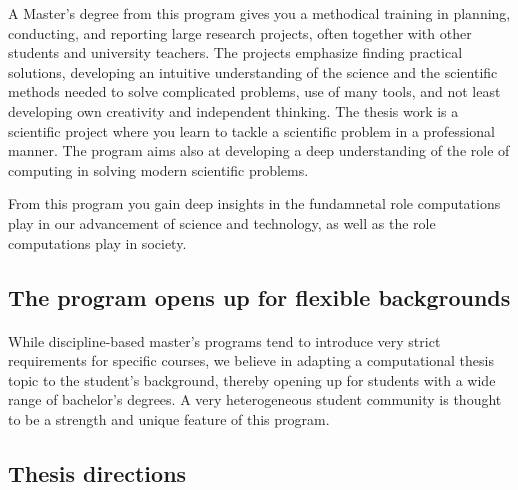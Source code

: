 \documentclass[%
oneside,                 %
final,                   %
10pt]{article}
\begin{document}
A Master’s degree from this program gives you a methodical
training in planning, conducting, and reporting large research
projects, often together with other students and university teachers.
The projects emphasize finding practical solutions, developing an
intuitive understanding of the science and the scientific methods
needed to solve complicated problems, use of many tools, and not least
developing own creativity and independent thinking. The thesis
work is a scientific project where you learn to tackle a
scientific problem in a professional manner.   The program aims also at
developing a deep understanding of the role of computing in solving modern scientific
problems. 

From this program you gain  deep insights in the fundamnetal role
computations play  in our advancement of science and technology, as well as the role computations play  in society.



\subsection*{The program opens up for flexible backgrounds}


\paragraph{}
While discipline-based master's programs tend to introduce very strict
requirements for specific courses, we believe in adapting a computational thesis
topic to the student's background, thereby opening up for
students with a wide range of bachelor's degrees.
A very heterogeneous student community is thought to be a strength and
unique feature of this program.



\subsection*{Thesis directions}

\paragraph{}
\end{document}
